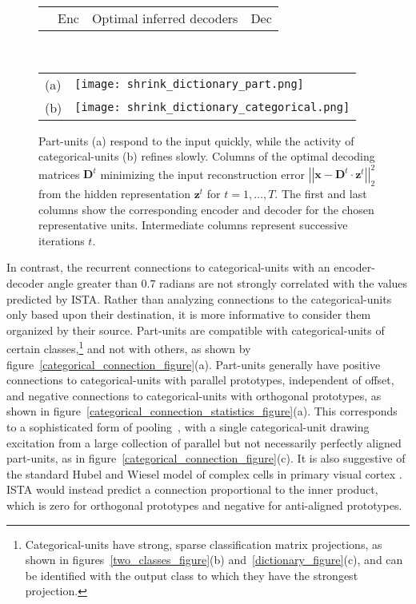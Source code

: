 \documentclass{article} %
\newcommand{\hid}{\mathbf{z}}
\newcommand{\inp}{\mathbf{x}}
\newcommand{\D}{\mathbf{D}}
\begin{document}
\begin{figure}[tb] %
  \begin{center}
    \begin{tabular}{p{0.12in}p{0.35in}p{4.05in}p{1in}} & Enc & Optimal inferred decoders & Dec \end{tabular} \\
    \begin{tabular}{p{0.03in}p{5.0in}}
      \parbox[b]{0in}{(a) \vspace{2.1cm}} & \texttt{[image: shrink\_dictionary\_part.png]} \\
      \parbox[b]{0in}{(b) \vspace{2.1cm}} & \texttt{[image: shrink\_dictionary\_categorical.png]} 
    \end{tabular}
  \end{center}
  \caption{Part-units (a) respond to the input quickly, while the activity of categorical-units (b) refines slowly.  Columns of the optimal decoding matrices $\D^t$ minimizing the input reconstruction error $\left|\left| \inp - \D^t \cdot \hid^t \right|\right|_2^2$ from the hidden representation $\hid^t$ for $t = 1, \ldots, T$.  The first and last columns show the corresponding encoder and decoder for the chosen representative units.  Intermediate columns represent successive iterations $t$.  \label{dictionary_evolution_figure}} %
\end{figure}

In contrast, the recurrent connections to categorical-units with an encoder-decoder angle greater than $0.7$ radians are not strongly correlated with the values predicted by ISTA.  
Rather than analyzing connections to the categorical-units only based upon their destination, it is more informative to consider them organized by their source.
Part-units are compatible with categorical-units of certain classes,\footnote{Categorical-units have strong, sparse classification matrix projections, as shown in figures~\ref{two_classes_figure}(b) and~\ref{dictionary_figure}(c), and can be identified with the output class to which they have the strongest projection.} and not with others, as shown by figure~\ref{categorical_connection_figure}(a).  
Part-units generally have positive connections to categorical-units with parallel prototypes, independent of offset, and negative connections to categorical-units with orthogonal prototypes, as shown in figure~\ref{categorical_connection_statistics_figure}(a).  This corresponds to a sophisticated form of pooling~\citep{jarrett2009},  with a single categorical-unit drawing excitation from a large collection of parallel but not necessarily perfectly aligned part-units, as in figure~\ref{categorical_connection_figure}(c).  It is also suggestive of the standard Hubel and Wiesel model of complex cells in primary visual cortex \citep{hubel1962}.  ISTA would instead predict a connection proportional to the inner product, which is zero for orthogonal prototypes and negative for anti-aligned prototypes. %
\end{document}

